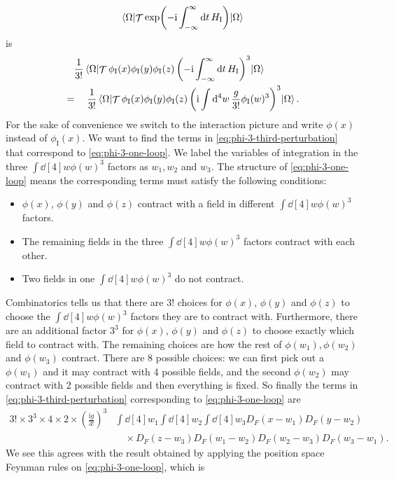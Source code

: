 \documentclass[hyperref, a4paper]{article}
\DeclareMathOperator{\timeorder}{\mathcal{T}}
\newcommand*{\ii}{\mathrm{i}}
\begin{document}
\begin{itemize}
\[{            }{
                \expval*{\timeorder \exp(- \ii \int_{-\infty}^\infty \dd{t} H_\text{I})}{\Omega}
            }
    \]
    is 
    \begin{equation}
        \begin{aligned}
            &\quad \frac{1}{3!} \expval*{\timeorder \phi_\text{I}(x) \phi_\text{I}(y) \phi_\text{I}(z) \left( - \ii \int_{-\infty}^\infty \dd{t} H_\text{I} \right)^3 }{\Omega} \\
            &= \quad \frac{1}{3!} \expval*{\timeorder \phi_\text{I}(x) \phi_\text{I}(y) \phi_\text{I}(z) \left( \ii \int \dd[4]{w} \frac{g}{3!} \phi_\text{I}(w)^3 \right)^3 }{\Omega}.
        \end{aligned}
        \label{eq:phi-3-third-perturbation}
    \end{equation}
    For the sake of convenience we switch to the interaction picture and write $\phi(x)$ instead of $\phi_\text{I}(x)$.
    We want to find the terms in \eqref{eq:phi-3-third-perturbation} that correspond to \eqref{eq:phi-3-one-loop}.
    We label the variables of integration in the three $\int \dd[4]{w} \phi(w)^3$ factors as $w_1, w_2$ and $w_3$.
    The structure of \eqref{eq:phi-3-one-loop} means the corresponding terms must satisfy the following conditions:
    \begin{itemize}
        \item $\phi(x)$, $\phi(y)$ and $\phi(z)$ contract with a field in different $\int \dd[4]{w} \phi(w)^3$ factors.
        \item The remaining fields in the three $\int \dd[4]{w} \phi(w)^3$ factors contract with each other.
        \item Two fields in one $\int \dd[4]{w} \phi(w)^3$ do not contract.
    \end{itemize}
    Combinatorics tells us that there are $3!$ choices for $\phi(x)$, $\phi(y)$ and $\phi(z)$ to choose the $\int \dd[4]{w} \phi(w)^3$ factors they are to contract with.
    Furthermore, there are an additional factor $3^3$ for $\phi(x)$, $\phi(y)$ and $\phi(z)$ to choose exactly which field to contract with.
    The remaining choices are how the rest of $\phi(w_1), \phi(w_2)$ and $\phi(w_3)$ contract. 
    There are 8 possible choices: we can first pick out a $\phi(w_1)$ and it may contract with 4 possible fields, 
    and the second $\phi(w_2)$ may contract with 2 possible fields and then everything is fixed.
    So finally the terms in \eqref{eq:phi-3-third-perturbation} corresponding to \eqref{eq:phi-3-one-loop} are 
    \[
        \begin{aligned}
            3! \times 3^3 \times 4 \times 2 \times \left(\frac{\ii g}{3!}\right)^3 & \int \dd[4]{w_1} \int \dd[4]{w_2} \int \dd[4]{w_3} D_F(x - w_1) D_F(y - w_2) \\
            &\quad \times D_F(z - w_3) D_F(w_1 - w_2) D_F(w_2 - w_3) D_F(w_3 - w_1).
        \end{aligned}
    \]
    We see this agrees with the result obtained by applying the position space Feynman rules on \eqref{eq:phi-3-one-loop}, which is 
    


\end{itemize}
\end{document}
